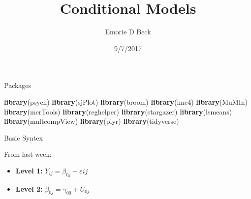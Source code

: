 \documentclass[ignorenonframetext,]{beamer}
\title{Conditional Models}
\author{Emorie D Beck}
\date{9/7/2017}
\newenvironment{Shaded}{\begin{snugshade}}{\end{snugshade}}
\newcommand{\KeywordTok}[1]{\textcolor[rgb]{0.13,0.29,0.53}{\textbf{{#1}}}}
\newcommand{\NormalTok}[1]{{#1}}
\begin{document}
\frame{\titlepage}

\begin{frame}[fragile]{Packages}

\begin{Shaded}
\begin{Highlighting}[]
\KeywordTok{library}\NormalTok{(psych)}
\KeywordTok{library}\NormalTok{(sjPlot)}
\KeywordTok{library}\NormalTok{(broom)}
\KeywordTok{library}\NormalTok{(lme4)}
\KeywordTok{library}\NormalTok{(MuMIn)}
\KeywordTok{library}\NormalTok{(merTools)}
\KeywordTok{library}\NormalTok{(reghelper)}
\KeywordTok{library}\NormalTok{(stargazer)}
\KeywordTok{library}\NormalTok{(lsmeans)}
\KeywordTok{library}\NormalTok{(multcompView)}
\KeywordTok{library}\NormalTok{(plyr)}
\KeywordTok{library}\NormalTok{(tidyverse)}
\end{Highlighting}
\end{Shaded}

\end{frame}

\begin{frame}{Basic Syntex}

From last week:

\begin{itemize}
  \item \textbf{Level 1:} $Y_{ij} = \beta_{0j} + \varepsilon{ij}$
  \item \textbf{Level 2:} $\beta_{0j} = \gamma_{00} + U_{0j}$
\end{itemize}

\end{frame}
\end{document}
